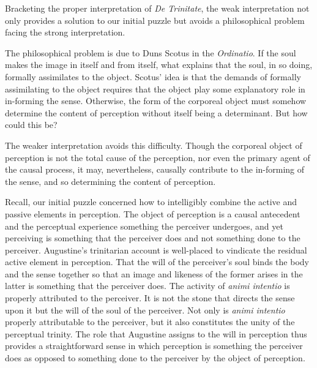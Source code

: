 \documentclass[12pt]{article}
\begin{document}
Bracketing the proper interpretation of \emph{De Trinitate}, the weak interpretation not only provides a solution to our initial puzzle but avoids a philosophical problem facing the strong interpretation.

The philosophical problem is due to Duns Scotus in the \emph{Ordinatio}. If the soul makes the image in itself and from itself, what explains that the soul, in so doing, formally assimilates to the object. Scotus' idea is that the demands of formally assimilating to the object requires that the object play some explanatory role in in-forming the sense. Otherwise, the form of the corporeal object must somehow determine the content of perception without itself being a determinant. But how could this be?

The weaker interpretation avoids this difficulty. Though the corporeal object of perception is not the total cause of the perception, nor even the primary agent of the causal process, it may, nevertheless, causally contribute to the in-forming of the sense, and so determining the content of perception.

Recall, our initial puzzle concerned how to intelligibly combine the active and passive elements in perception. The object of perception is a causal antecedent and the perceptual experience something the perceiver undergoes, and yet perceiving is something that the perceiver does and not something done to the perceiver. Augustine’s trinitarian account is well-placed to vindicate the residual active element in perception. That the will of the perceiver’s soul binds the body and the sense together so that an image and likeness of the former arises in the latter is something that the perceiver does. The activity of \emph{animi intentio} is properly attributed to the perceiver. It is not the stone that directs the sense upon it but the will of the soul of the perceiver. Not only is \emph{animi intentio} properly attributable to the perceiver, but it also constitutes the unity of the perceptual trinity. The role that Augustine assigns to the will in perception thus provides a straightforward sense in which perception is something the perceiver does as opposed to something done to the perceiver by the object of perception.
\end{document}
